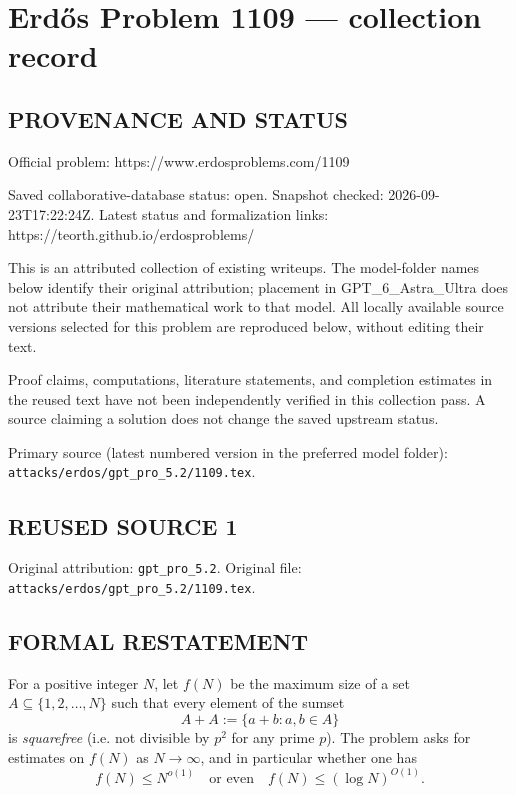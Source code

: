 \section*{Erd\H{o}s Problem 1109 --- collection record}

\subsection*{PROVENANCE AND STATUS}
Official problem: https://www.erdosproblems.com/1109

Saved collaborative-database status: open.
Snapshot checked: 2026-09-23T17:22:24Z.
Latest status and formalization links: https://teorth.github.io/erdosproblems/

This is an attributed collection of existing writeups. The model-folder names below identify their original attribution; placement in GPT\_6\_Astra\_Ultra does not attribute their mathematical work to that model. All locally available source versions selected for this problem are reproduced below, without editing their text.

Proof claims, computations, literature statements, and completion estimates in the reused text have not been independently verified in this collection pass. A source claiming a solution does not change the saved upstream status.

Primary source (latest numbered version in the preferred model folder): \texttt{attacks/erdos/gpt\_pro\_5.2/1109.tex}.

\subsection*{REUSED SOURCE 1}
Original attribution: \texttt{gpt\_pro\_5.2}.
Original file: \texttt{attacks/erdos/gpt\_pro\_5.2/1109.tex}.


\subsection*{FORMAL RESTATEMENT}
For a positive integer $N$, let $f(N)$ be the maximum size of a set $A\subseteq\{1,2,\dots,N\}$ such that every element of the sumset
\[A+A := \{a+b : a,b\in A\}\]
is \emph{squarefree} (i.e. not divisible by $p^2$ for any prime $p$).
The problem asks for estimates on $f(N)$ as $N\to\infty$, and in particular whether one has
\[f(N)\le N^{o(1)}\quad\text{or even}\quad f(N)\le (\log N)^{O(1)}.
\]

